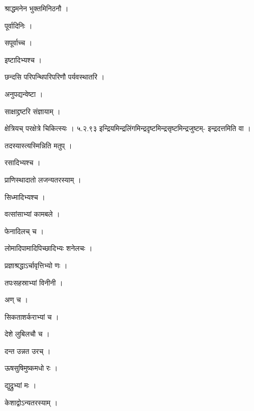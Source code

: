 \documentclass[10pt, openany]{book}
\begin{document}
\noindent श्राद्धमनेन भुक्तमिनिठनौ ।

\noindent पूर्वादिनिः ।

\noindent सपूर्वाच्च ।

\noindent इष्टादिभ्यश्च ।

\noindent छन्दसि परिपन्थिपरिपरिणौ पर्यवस्थातरि ।

\noindent अनुपद्यन्वेष्टा ।

\noindent साक्षाद्द्रष्टरि संज्ञायाम् ।

\noindent क्षेत्रियच् परक्षेत्रे चिकित्स्यः । ५.२.९३ इन्द्रियमिन्द्रलिंगमिन्द्रदृष्टमिन्द्रसृष्टमिन्द्रजुष्टम्- इन्द्रदत्तमिति वा ।

\noindent तदस्यास्त्यस्मिन्निति मतुप् ।

\noindent रसादिभ्यश्च ।

\noindent प्राणिस्थादातो लजन्यतरस्याम् ।

\noindent सिध्मादिभ्यश्च ।

\noindent वत्सांसाभ्यां कामबले ।

\noindent फेनादिलच् च ।

\noindent लोमादिपामादिपिच्छादिभ्यः शनेलचः ।

\noindent प्रज्ञाश्रद्धाऽर्चावृत्तिभ्यो णः ।

\noindent तपःसहस्राभ्यां विनीनी ।

\noindent अण् च ।

\noindent सिकताशर्कराभ्यां च ।

\noindent देशे लुबिलचौ च ।

\noindent दन्त उन्नत उरच् ।

\noindent ऊषसुषिमुष्कमधो रः ।

\noindent द्युद्रुभ्यां मः ।

\noindent केशाद्वोऽन्यतरस्याम् ।
\end{document}
